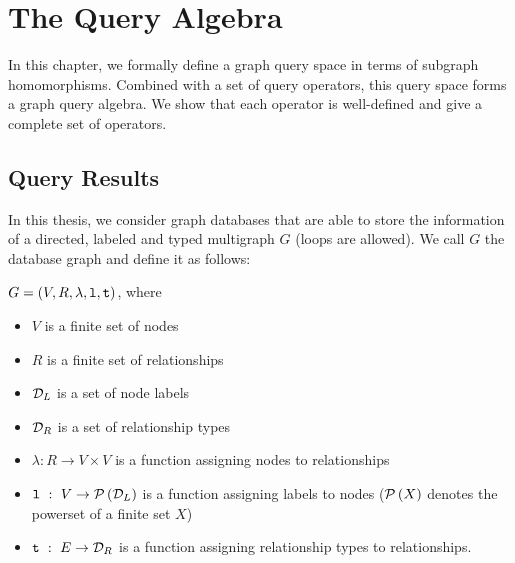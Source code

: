 \chapter{The Query Algebra}
\label{chap:query-algebra}

\begin{aboutchapter}
In this chapter, we formally define a graph query space in terms of subgraph
homomorphisms.
Combined with a set of query operators, this query space forms a graph query
algebra. We show that each operator is well-defined and give a complete set
of operators.
\end{aboutchapter}

\section{Query Results}

\begin{definition}
\label{def:database-graph}
In this thesis, we consider graph databases that are able to store the
information of a directed, labeled and typed multigraph $G$ (loops are allowed).
We call $G$ the database graph and define it as follows:

$G = (V, R, \lambda, \texttt{l}, \texttt{t})$, where
\begin{itemize}
  \item $V$ is a finite set of nodes
  \item $R$ is a finite set of relationships
  \item $\mathcal{D}_L$ is a set of node labels
  \item $\mathcal{D}_R$ is a set of relationship types
  \item $\lambda : R \rightarrow V \times V$ is a function assigning nodes to
    relationships
  \item $\texttt{l} ~:~ V \rightarrow \mathcal{P}\left(\mathcal{D}_L\right)$ is a function assigning
    labels to nodes
    ($\mathcal{P}\left(X\right)$ denotes the powerset of a finite set $X$)
  \item $\texttt{t} ~:~ E \rightarrow \mathcal{D}_R$ is a function assigning relationship
    types to relationships.
\end{itemize}
\end{definition}

